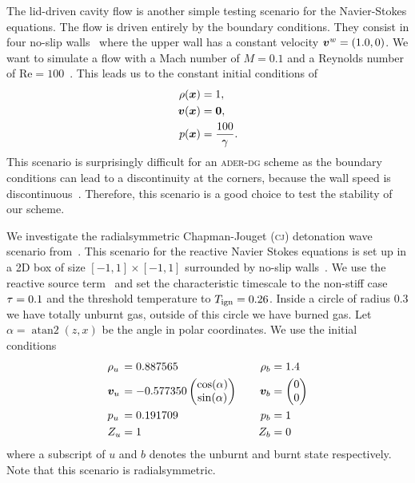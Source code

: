 The lid-driven cavity flow is another simple testing scenario for the Navier-Stokes equations.
The flow is driven entirely by the boundary conditions.
They consist in four no-slip walls~ where the upper wall has a constant velocity $\bm{v}^w = (1.0, 0)$.
We want to simulate a flow with a Mach number of $M = 0.1$ and a Reynolds number of $\text{Re} = 100$~\cite{fambri2017space}.
This leads us to the constant initial conditions of
\begin{align}
  \label{eq:lid-driven-cavity}
  \begin{split}
  \rho(\bm{x}) &= 1,\\
  \bm{v}(\bm{x}) &=  \bm{0},\\
  p(\bm{x}) &= \frac{100}{\gamma}.
  \end{split}
\end{align}
This scenario is surprisingly difficult for an \textsc{ader-dg} scheme as the boundary conditions can lead to a discontinuity at the corners, because the wall speed is discontinuous~\cite{fambri2017space}.
Therefore, this scenario is a good choice to test the stability of our scheme.

We investigate the radialsymmetric Chapman-Jouget (\textsc{cj}) detonation wave scenario from~\cite{helzel2000modified}.
This scenario for the reactive Navier Stokes equations is set up in a 2D box of size $[-1, 1] \times [-1, 1]$ surrounded by no-slip walls~.
We use the reactive source term~ and set the characteristic timescale to the non-stiff case $\tau = 0.1$ and the threshold temperature to $T_{\text{ign}} = 0.26$.
Inside a circle of radius $0.3$ we have totally unburnt gas, outside of this circle we have burned gas.
Let $\alpha =  \operatorname{atan2}(z,x)$ be the angle in polar coordinates.
We use the initial conditions
\begin{equation}\label{eq:cj-detonation}
\begin{alignedat}{6}
  & \rho_u &&= 0.887565 \qquad& \rho_b &= 1.4\\
  & \bm{v}_u &&= -0.577350
  \begin{pmatrix}
     \cos (\alpha)\\
     \sin (\alpha)
   \end{pmatrix}  \qquad& \bm{v}_b  &=
   \begin{pmatrix}
     0 \\
     0
   \end{pmatrix}\\
   & p_u &&=0.191709 \qquad& p_b &= 1\\
   & Z_u &&= 1 \quad& Z_b &= 0
  \end{alignedat}
\end{equation}
where a subscript of $u$ and $b$ denotes the unburnt and burnt state respectively.
Note that this scenario is radialsymmetric.

